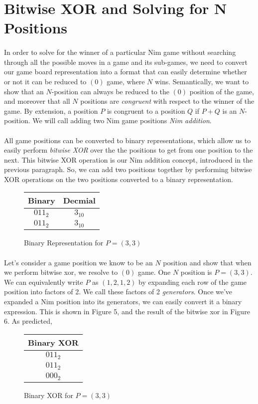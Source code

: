 \documentclass{article}
\begin{document}
\section*{Bitwise XOR and Solving for N Positions}

\paragraph{}
In order to solve for the winner of a particular Nim game without searching through all the possible moves in a game and its sub-games, we need to convert our game board representation into a format that can easily determine whether or not it can be reduced to $(0)$ game, where $N$ wins. Semantically, we want to show that an $N$-position can always be reduced to the $(0)$ position of the game, and moreover that all $N$ positions are \textit{congruent} with respect to the winner of the game. By extension, a position $P$ is congruent to a position $Q$ if $P + Q$ is an $N$-position. We will call adding two Nim game positions \textit{Nim addition}.

\paragraph{}
All game positions can be converted to binary representations, which allow us to easily perform \textit{bitwise XOR} over the the positions to get from one position to the next. This bitwise XOR operation is our Nim addition concept, introduced in the previous paragraph. So, we can add two positions together by performing bitwise XOR operations on the two positions converted to a binary representation.

\begin{figure}[h]
\centering
\begin{tabular}{|c|c|}
\hline
Binary & Decmial\\
\hline
$011_{2}$ & $3_{10}$\\
$011_{2}$ & $3_{10}$\\
\hline
\end{tabular}
\caption{Binary Representation for $P = (3,3)$}
\end{figure}
\pagebreak
\paragraph{}
Let's consider a game position we know to be an $N$ position and show that when we perform bitwise xor, we resolve to $(0)$ game. One $N$ position is $P = (3,3)$. We can equivalently write $P$ as $(1, 2, 1, 2)$ by expanding each row of the game position into factors of 2. We call these factors of 2 \textit{generators}. Once we've expanded a Nim position into its generators, we can easily convert it a binary expression. This is shown in Figure 5, and the result of the bitwise xor in Figure 6. As predicted, 

\begin{figure}[h]
\centering
\begin{tabular}{|c|}
\hline
Binary XOR\\
\hline
$011_{2}$\\
$011_{2}$\\
\hline
$000_{2}$\\
\hline
\end{tabular}
\caption{Binary XOR for $P = (3,3)$}
\end{figure}

\paragraph{}
\end{document}
